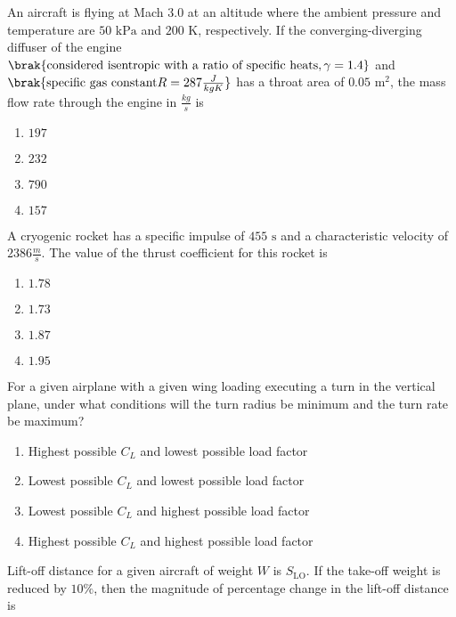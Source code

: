     \item An aircraft is flying at Mach $3.0$ at an altitude where the ambient pressure and temperature are $50 \text{ kPa}$ and $200 \text{ K}$, respectively. If the converging-diverging diffuser of the engine $\brak{\text{considered isentropic with a ratio of specific heats}, \gamma = 1.4}$ and $\brak{\text{specific gas constant} R = 287 \frac{ J}{kg K}}$ has a throat area of $0.05 \text{ m}^2$, the mass flow rate through the engine in $\frac{kg}{s}$ is
    \begin{enumerate}
        \item $197$
        \item $232$
        \item $790$
        \item $157$
    \end{enumerate}

    \item A cryogenic rocket has a specific impulse of $455 \text{ s}$ and a characteristic velocity of $2386 \frac{ m}{s}$. The value of the thrust coefficient for this rocket is
    \begin{enumerate}
        \item $1.78$
        \item $1.73$
        \item $1.87$
        \item $1.95$
    \end{enumerate}

    \item For a given airplane with a given wing loading executing a turn in the vertical plane, under what conditions will the turn radius be minimum and the turn rate be maximum?
    \begin{enumerate}
        \item Highest possible $C_L$ and lowest possible load factor
        \item Lowest possible $C_L$ and lowest possible load factor
        \item Lowest possible $C_L$ and highest possible load factor
        \item Highest possible $C_L$ and highest possible load factor
    \end{enumerate}

    \item Lift-off distance for a given aircraft of weight $W$ is $S_{\text{LO}}$. If the take-off weight is reduced by $10\%$, then the magnitude of percentage change in the lift-off distance  is


 






 


